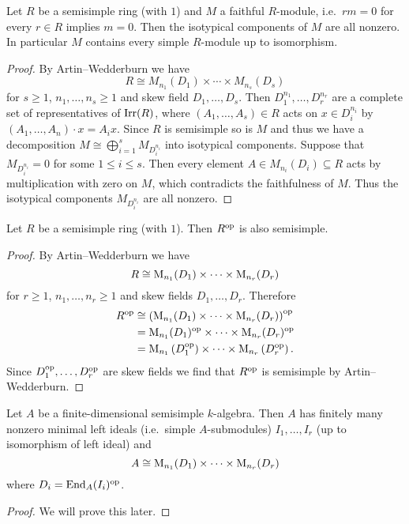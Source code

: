 \begin{cor}
  Let $R$ be a semisimple ring (with $1$) and $M$ a faithful $R$-module, i.e.\ $rm = 0$ for every $r \in R$ implies $m = 0$.
  Then the isotypical components of $M$ are all nonzero.
  In particular $M$ contains every simple $R$-module up to isomorphism.
\end{cor}
\begin{proof}
  By Artin--Wedderburn we have
  \[
    R \cong M_{n_1}(D_1) \times \dotsb \times M_{n_s}(D_s)
  \]
  for $s \geq 1$, $n_1, \dotsc, n_s \geq 1$ and skew field $D_1, \dotsc, D_s$.
  Then $D_1^{n_1}, \dotsc, D_r^{n_r}$ are a complete set of representatives of $\operatorname{Irr}(R)$, where $(A_1, \dotsc, A_s) \in R$ acts on $x \in D_i^{n_i}$ by $(A_1, \dotsc, A_n) \cdot x = A_i x$.
  Since $R$ is semisimple so is $M$ and thus we have a decomposition $M \cong \bigoplus_{i=1}^s M_{D_i^{n_i}}$ into isotypical components.
  Suppose that $M_{D_i^{n_i}} = 0$ for some $1 \leq i \leq s$.
  Then every element $A \in M_{n_i}(D_i) \subseteq R$ acts by multiplication with zero on $M$, which contradicts the faithfulness of $M$.
  Thus the isotypical components $M_{D_i^{n_i}}$ are all nonzero.
\end{proof}




\begin{cor}
  Let $R$ be a semisimple ring (with $1$).
  Then $R^{\mathrm{op}}$ is also semisimple.
\end{cor}
\begin{proof}
  By Artin--Wedderburn we have
  \[
    R \cong \operatorname{M}_{n_1}(D_1) \times \dotsm \times \operatorname{M}_{n_r}(D_r)
  \]
  for $r \geq 1$, $n_1, \dotsc, n_r \geq 1$ and skew fields $D_1, \dotsc, D_r$.
  Therefore
  \begin{align*}
            R^{\mathrm{op}}
    &\cong  \left( \operatorname{M}_{n_1}(D_1) \times \dotsm \times \operatorname{M}_{n_r}(D_r) \right)^{\mathrm{op}} \\
    &=      \operatorname{M}_{n_1}(D_1)^{\mathrm{op}} \times \dotsm \times \operatorname{M}_{n_r}(D_r)^{\mathrm{op}} \\
    &=      \operatorname{M}_{n_1}\left( D_1^{\mathrm{op}} \right) \times \dotsm \times \operatorname{M}_{n_r}\left( D_r^{\mathrm{op}} \right).
  \end{align*}
  Since $D_1^{\mathrm{op}}, \dotsc, D_r^{\mathrm{op}}$ are skew fields we find that $R^{\mathrm{op}}$ is semisimple by Artin--Wedderburn.
\end{proof}


\begin{cor}
  Let $A$ be a finite-dimensional semisimple $k$-algebra.
  Then $A$ has finitely many nonzero minimal left ideals (i.e.\ simple $A$-submodules) $I_1, \dotsc, I_r$ (up to isomorphism of left ideal) and
  \[
    A \cong \operatorname{M}_{n_1}(D_1) \times \dotsm \times \operatorname{M}_{n_r}(D_r)
  \]
  where $D_i = \operatorname{End}_A(I_i)^{\mathrm{op}}$.
\end{cor}
\begin{proof}
  We will prove this later.
\end{proof}


